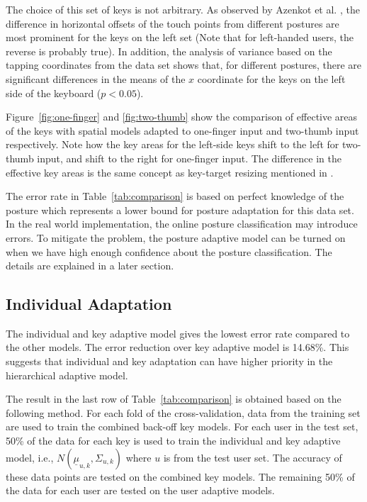 \documentclass{sigchi}
\begin{document}
The choice of this set of keys is not arbitrary. As observed by Azenkot et al. \cite{Azenkot:2012}, the difference in horizontal
offsets of the touch points from different postures are most prominent for the keys on the
left set (Note that for left-handed users, the reverse is probably true). 
In addition, the analysis of variance based on the tapping coordinates from the
data set shows that, for different postures, there are significant differences in the means of
the $x$ coordinate for the keys on the left side of the keyboard ($p < 0.05$). 

Figure~\ref{fig:one-finger} and \ref{fig:two-thumb} show the comparison of effective areas of the keys
with spatial models adapted to one-finger input and two-thumb input respectively. Note how the key areas for the left-side keys shift to the left
for two-thumb input, and shift to the right for one-finger input. The difference in 
the effective key areas is the same concept as key-target resizing mentioned in \cite{Gunawardana:2010, Rudchenko:2011}.

The error rate in Table~\ref{tab:comparison} is based on perfect knowledge of
the posture which represents a lower bound for posture adaptation for this data
set. In the real world implementation, the online posture classification may
introduce errors. To mitigate the problem, the posture adaptive model can be turned on
when we have high enough confidence about the posture classification. The details are explained in a later section.

\subsection{Individual Adaptation}
The individual and key adaptive model gives the lowest error rate compared to the
other models. The error reduction over key adaptive model is 14.68\%.
This suggests that individual and key adaptation can have higher priority in the hierarchical
adaptive model. 

The result in the last row of Table~\ref{tab:comparison} is obtained based on the 
following method. For each fold of the cross-validation, data from the training set are used to 
train the combined back-off key models. For each user in the test set,
50\% of the data for each key is used to train the individual and key adaptive
model, i.e., $N(\underline \mu_{u, k}, \Sigma_{u, k})$ where $u$ is from the test user set.
The accuracy of these data points are tested on the combined key models.
The remaining 50\% of the data for each user are tested on the user adaptive 
models. 
\end{document}

